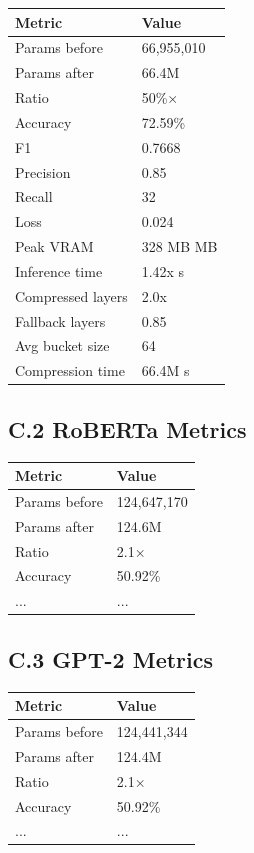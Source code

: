 \begin{table}[H]
\centering
\small
\begin{tabular}{ll}
\toprule
\textbf{Metric} & \textbf{Value} \\
\midrule
Params before & 66,955,010 \\
Params after & 66.4M \\
Ratio & 50\%$\times$ \\
Accuracy & 72.59\% \\
F1 & 0.7668 \\
Precision & 0.85 \\
Recall & 32 \\
Loss & 0.024 \\
Peak VRAM & 328 MB MB \\
Inference time & 1.42x s \\
Compressed layers & 2.0x \\
Fallback layers & 0.85 \\
Avg bucket size & 64 \\
Compression time & 66.4M s \\
\bottomrule
\end{tabular}
\end{table}

\subsection{C.2 RoBERTa Metrics}

\begin{table}[H]
\centering
\small
\begin{tabular}{ll}
\toprule
\textbf{Metric} & \textbf{Value} \\
\midrule
Params before & 124,647,170 \\
Params after & 124.6M \\
Ratio & 2.1$\times$ \\
Accuracy & 50.92\% \\
... & ... \\
\bottomrule
\end{tabular}
\end{table}

\subsection{C.3 GPT-2 Metrics}

\begin{table}[H]
\centering
\small
\begin{tabular}{ll}
\toprule
\textbf{Metric} & \textbf{Value} \\
\midrule
Params before & 124,441,344 \\
Params after & 124.4M \\
Ratio & 2.1$\times$ \\
Accuracy & 50.92\% \\
... & ... \\
\bottomrule
\end{tabular}
\end{table}

